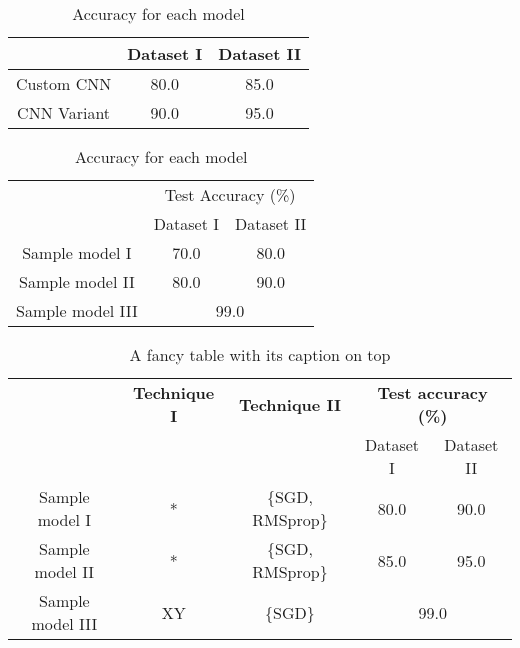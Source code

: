 \begin{table}[htbp]
\centering
\begin{tabular}{c|c|c}
\hline
& Dataset I & Dataset II \\ 
\hline \hline

Custom CNN & 80.0 & 85.0\\ \hline
CNN Variant & 90.0 & 95.0 \\ \hline

\end{tabular}
\caption{Accuracy for each model}
\label{table1}
\end{table}


\begin{table}[htbp]
\centering
\begin{tabular}{|c|c|c|}
\hline
 & \multicolumn{2}{c|}{Test Accuracy (\%)} \\ \cline{2-3}
 & Dataset I & Dataset II \\ \hline \hline
Sample model I & 70.0 & 80.0 \\ \hline
Sample model II & 80.0 & 90.0 \\ \hline
Sample model III & \multicolumn{2}{c|}{99.0} \\\hline

\end{tabular}
\caption{Accuracy for each model}
\label{table2}
\end{table}


\begin{table}[!htbp]
  \begin{center}
    \caption{A fancy table with its caption on top}
    \label{table3}
    \begin{tabular}{|c|c|c|c|c|} 
    \hline
      & \textbf{Technique I} & \textbf{Technique II} &\multicolumn{2}{c|}{\textbf{Test accuracy (\%)} }\\ \cline{4-5}
      & & & Dataset I & Dataset II \\
      \hline \hline
        Sample model I & * & \{SGD, RMSprop\} & 80.0 & 90.0 \\ \hline
        Sample model II & * & \{SGD, RMSprop\} & 85.0 & 95.0 \\ \hline
        Sample model III & XY & \{SGD\} & \multicolumn{2}{c|}{99.0} \\
    \hline
    \end{tabular}
  \end{center}
\end{table}


